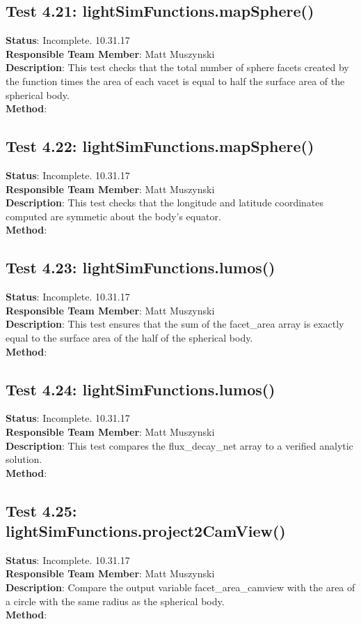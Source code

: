 \documentclass[]{DINOReportMemo}
\begin{document}
\subsection{Test 4.21: lightSimFunctions.mapSphere()}
\textbf{Status}: Incomplete. 10.31.17\\
\textbf{Responsible Team Member}: Matt Muszynski \\
\textbf{Description}: This test checks that the total number of sphere facets created by the function times the area of each vacet is equal to half the surface area of the spherical body.\\
\textbf{Method}: \\

\subsection{Test 4.22: lightSimFunctions.mapSphere()}
\textbf{Status}: Incomplete. 10.31.17\\
\textbf{Responsible Team Member}: Matt Muszynski \\
\textbf{Description}: This test checks that the longitude and latitude coordinates computed are symmetic about the body's equator.\\
\textbf{Method}: \\

\subsection{Test 4.23: lightSimFunctions.lumos()}
\textbf{Status}: Incomplete. 10.31.17\\
\textbf{Responsible Team Member}: Matt Muszynski \\
\textbf{Description}: This test ensures that the sum of the facet\_area array is exactly equal to the surface area of the half of the spherical body.\\
\textbf{Method}: \\

\subsection{Test 4.24: lightSimFunctions.lumos()}
\textbf{Status}: Incomplete. 10.31.17\\
\textbf{Responsible Team Member}: Matt Muszynski \\
\textbf{Description}: This test compares the flux\_decay\_net array to a verified analytic solution. \\
\textbf{Method}: \\

\subsection{Test 4.25: lightSimFunctions.project2CamView()}
\textbf{Status}: Incomplete. 10.31.17\\
\textbf{Responsible Team Member}: Matt Muszynski \\
\textbf{Description}: Compare the output variable facet\_area\_camview with the area of a circle with the same radius as the spherical body. \\
\textbf{Method}: \\
\end{document}
